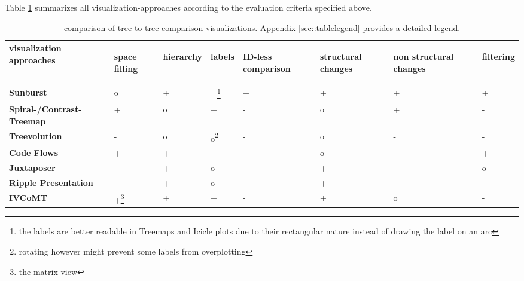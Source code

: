 Table \ref{chap5:comparison} summarizes all visualization-approaches according to the evaluation criteria specified above.

\begin{table}[tb]
\begin{minipage}{\linewidth}
\centering 
\begin{tabularx}{0.8\textwidth}{|l|>{\centering\arraybackslash}X|>{\centering\arraybackslash}X|>{\centering\arraybackslash}X|>{\centering\arraybackslash}X|>{\centering\arraybackslash}X|>{\centering\arraybackslash}X|>{\centering\arraybackslash}X|} 
\hline
\centering\textbf{visualization approaches} & \begin{sideways}\textbf{space filling}\end{sideways} & \begin{sideways}\textbf{hierarchy}\end{sideways} & \begin{sideways}\textbf{labels}\end{sideways} & \begin{sideways}\textbf{ID-less comparison}\end{sideways} & \begin{sideways}\textbf{structural changes}\end{sideways} & \begin{sideways}\textbf{non structural changes\ }\end{sideways} & \begin{sideways}\textbf{filtering}\end{sideways}\\
\hline
\hline
\textbf{Sunburst} & o & + & +\footnote{the labels are better readable in Treemaps and Icicle plots due to their rectangular nature instead of drawing the label on an arc} & + & + & + & +\\
\hline
\textbf{Spiral-/Contrast-Treemap} & + & o & + & - & o & + & -\\
\hline
\textbf{Treevolution} & - & o & o\footnote{rotating however might prevent some labels from overplotting} & - & o & - & -\\
\hline
\textbf{Code Flows} & + & + & + & - & o & - & +\\
\hline
\textbf{Juxtaposer} & - & + & o & - & + & - & o \\
\hline
\textbf{Ripple Presentation} & - & + & o & - & + & - & -\\
\hline
\textbf{IVCoMT} & +\footnote{the matrix view} & + & + & - & + & o & -\\
\hline
\end{tabularx}
\label{chap5:comparison}
\vspace{0.5em} 
\caption{comparison of tree-to-tree comparison visualizations. Appendix \ref{sec::tablelegend} provides a detailed legend.}
\end{minipage}
\end{table}

